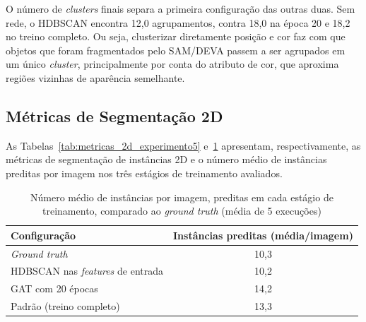 O número de \textit{clusters} finais separa a primeira configuração das outras duas. Sem rede, o HDBSCAN encontra 12,0 agrupamentos, contra 18,0 na época 20 e 18,2 no treino completo. Ou seja, clusterizar diretamente posição e cor faz com que objetos que foram fragmentados pelo SAM/DEVA passem a ser agrupados em um único \textit{cluster}, principalmente por conta do atributo de cor, que aproxima regiões vizinhas de aparência semelhante.

\subsection{Métricas de Segmentação 2D}

As Tabelas~\ref{tab:metricas_2d_experimento5} e~\ref{tab:instancias_experimento5} apresentam, respectivamente, as métricas de segmentação de instâncias 2D e o número médio de instâncias preditas por imagem nos três estágios de treinamento avaliados.

\begin{table}[h]
\centering
\caption{Métricas de segmentação de instância 2D em função do estágio de treinamento da GNN (IoU $\geq 0{,}5$; média de 5 execuções)}
\label{tab:metricas_2d_experimento5}
\end{table}

\begin{table}[h]
\centering
\caption{Número médio de instâncias por imagem, preditas em cada estágio de treinamento, comparado ao \textit{ground truth} (média de 5 execuções)}
\label{tab:instancias_experimento5}
\begin{tabular}{lc}
\hline
\textbf{Configuração} & \textbf{Instâncias preditas (média/imagem)} \\
\hline
\textit{Ground truth} & 10{,}3 \\
\hline
HDBSCAN nas \textit{features} de entrada & 10{,}2 \\
GAT com 20 épocas & 14{,}2 \\
Padrão (treino completo) & 13{,}3 \\
\hline
\end{tabular}
\end{table}

